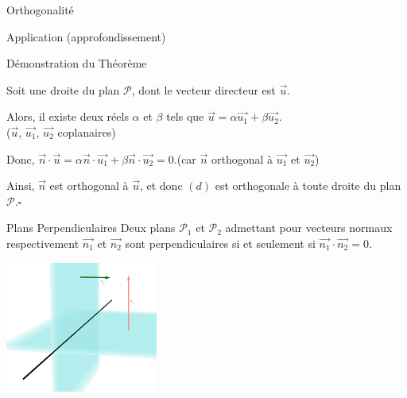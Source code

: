 \documentclass{coursbook}
\begin{document}
\begin{Gpartie}{Orthogonalité}
\begin{Spartie}{Application (approfondissement)}
\begin{SSpartie}{Démonstration du Théorème}
\begin{itemize}[leftmargin=7ex]
                    Soit une droite du plan $\mathcal{P}$, dont le vecteur directeur est $\vec{u}$.

                    Alors, il existe deux réels $\alpha$ et $\beta$ tels que $\vec{u}=\alpha\vec{u_1}+\beta\vec{u_2}$. \\ ($\vec{u}$, $\vec{u_1}$, $\vec{u_2}$ coplanaires)

                    Donc, $\vec{n}\cdot\vec{u}=\alpha\vec{n}\cdot\vec{u_1}+\beta\vec{n}\cdot\vec{u_2}=0$.\quad (car $\vec{n}$ orthogonal à $\vec{u_1}$ et $\vec{u_2}$)

                    Ainsi, $\vec{n}$ est orthogonal à $\vec{u}$, et donc $(d)$ est orthogonale à toute droite du plan~$\mathcal{P}$.\quad$\square$
                \end{itemize}
            \end{SSpartie}
        \end{Spartie}
        \vfill
        \begin{Spartie}{Plans Perpendiculaires} 
            Deux plans $\mathcal{P}_1$ et $\mathcal{P}_2$ admettant pour vecteurs normaux respectivement $\vec{n_1}$ et $\vec{n_2}$ sont perpendiculaires si et seulement si $\vec{n_1}\cdot\vec{n_2}=0$.

            \begin{center}
                \includegraphics[width=5cm]{rsc/12fig7.png}
                \parbox{\linewidth}{}
            \end{center}
        \end{Spartie}
    \end{Gpartie}
    \vfill
\end{document}
